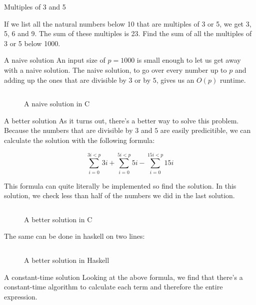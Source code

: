 \documentclass[main.tex]{subfiles}
\begin{document}
\begin{prob}{1}{Multiples of 3 and 5}
  \begin{problem}
    If we list all the natural numbers below 10 that are multiples of 3 or 5, we get 3, 5, 6 and 9. The sum of these multiples is 23.
    Find the sum of all the multiples of 3 or 5 below 1000.
  \end{problem}
  \begin{solutions}
    \begin{solution}{A naive solution}
      An input size of $p=1000$ is small enough to let us get away with a naive solution.
      The naive solution, to go over every number up to $p$ and adding up the ones that are divisible by $3$ or by $5$, gives us an $O(p)$ runtime.

      \begin{figure}[H]
        \centering
        \inputminted[firstline=13, lastline=23]{c}{\sol{001}{c}/naive.c}
        \caption{A naive solution in C}
      \end{figure}
    \end{solution}

    \begin{solution}{A better solution}
      As it turns out, there's a better way to solve this problem.
      Because the numbers that are divisible by $3$ and $5$ are easily predicitible, we can calculate the solution with the following formula:

      \[
        \sum_{i=0}^{3i < p}3i
        + \sum_{i=0}^{5i < p}5i
        - \sum_{i=0}^{15i < p}15i
      \]

      This formula can quite literally be implemented so find the solution.
      In this solution, we check less than half of the numbers we did in the last solution.

      \begin{figure}[H]
        \centering
        \inputminted[firstline=14, lastline=31]{c}{\sol{001}{c}/better.c}
        \caption{A better solution in C}
      \end{figure}

      The same can be done in haskell on two lines:
      \begin{figure}[H]
        \centering
        \inputminted[firstline=7, lastline=9]{haskell}{\sol{001}{haskell}/better.hs}
        \caption{A better solution in Haskell}
      \end{figure}
    \end{solution}

    \begin{solution}{A constant-time solution}
      Looking at the above formula, we find that there's a constant-time algorithm to calculate each term and therefore the entire expression.
    \end{solution}
  \end{solutions}
\end{prob}
\end{document}
